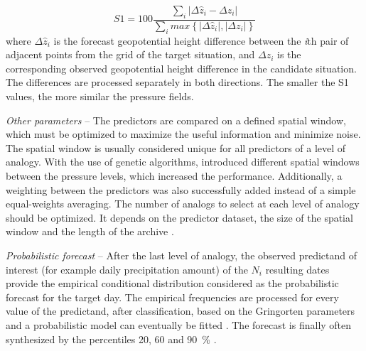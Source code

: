 \documentclass[review]{elsarticle}
\begin{document}
\begin{equation}
\label{eq:S1}
S1=100 \frac {\displaystyle \sum_{i} \vert \Delta\hat{z}_{i} - \Delta z_{i} \vert}
{\displaystyle \sum_{i} max\left\lbrace \vert \Delta\hat{z}_{i} \vert , \vert \Delta z_{i} \vert \right\rbrace }
\end{equation}
where $\Delta \hat{z}_{i}$ is the forecast geopotential height difference between the \textit{i}th pair of adjacent points from the grid of the target situation, and $\Delta z_{i}$ is the corresponding observed geopotential height difference in the candidate situation. The differences are processed separately in both directions. The smaller the S1 values, the more similar the pressure fields.

\textit{Other parameters} -- The predictors are compared on a defined spatial window, which must be optimized to maximize the useful information and minimize noise. The spatial window is usually considered unique for all predictors of a level of analogy. With the use of genetic algorithms, \citet{Horton2018a} introduced different spatial windows between the pressure levels, which increased the performance. Additionally, a weighting between the predictors was also successfully added instead of a simple equal-weights averaging. The number of analogs to select at each level of analogy should be optimized. It depends on the predictor dataset, the size of the spatial window and the length of the archive \citet{Ruosteenoja1988, Vandendool1994}.

\textit{Probabilistic forecast} -- After the last level of analogy, the observed predictand of interest (for example daily precipitation amount) of the $N_{i}$ resulting dates provide the empirical conditional distribution considered as the probabilistic forecast for the target day. The empirical frequencies are processed for every value of the predictand, after classification, based on the Gringorten parameters \cite[for a Gumbel or exponential law; see][]{Gringorten1963} and a probabilistic model can eventually be fitted \citep[e.g. Gamma function,][]{Obled2002}. The forecast is finally often synthesized by the percentiles 20, 60 and 90~\% \citep{Guilbaud1997, Guilbaud1998}.
\end{document}

